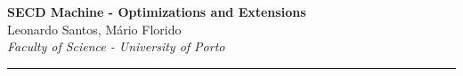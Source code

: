 \documentclass[a4paper,12pt]{article}
\begin{document}
\pagestyle{fancy}
\thispagestyle{empty}
\fancyhead[L]{}
\renewcommand*{\thefootnote}{\fnsymbol{footnote}}
\begin{center}
\Large{\textbf{SECD Machine - Optimizations and Extensions}}
\vspace{0.4cm}
\normalsize
\\ Leonardo Santos, Mário Florido \\
\vspace{0.1cm}
\textit{Faculty of Science - University of Porto}
\medskip
\normalsize
\end{center}
{\color{gray}\hrule}
\medskip

\newpage

\newpage

\newpage

\newpage

\newpage



\end{document}
